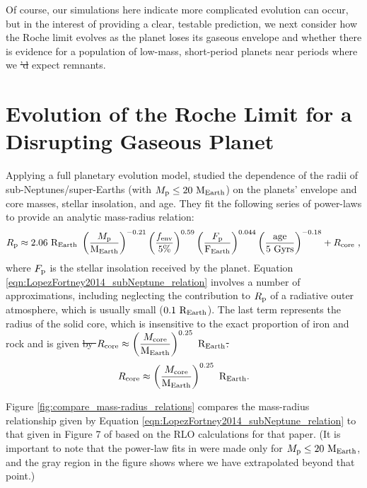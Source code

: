 \documentclass{svjour3}                     %
\providecommand{\DIFadd}[1]{{\protect\color{blue}\uwave{#1}}} %
\providecommand{\DIFdel}[1]{{\protect\color{red}\sout{#1}}}                      %
\providecommand{\DIFaddbegin}{} %
\providecommand{\DIFaddend}{} %
\providecommand{\DIFdelbegin}{} %
\providecommand{\DIFdelend}{} %
\begin{document}
Of course, our simulations here indicate more complicated evolution can occur, but in the interest of providing a clear, testable prediction, we next consider how the Roche limit evolves as the planet loses its gaseous envelope and whether there is evidence for a population of low-mass, short-period planets near periods where we \DIFdelbegin \DIFdel{'d }\DIFdelend \DIFaddbegin \DIFadd{would }\DIFaddend expect remnants.

\section{Evolution of the Roche Limit for a Disrupting Gaseous Planet}
\label{sec:Evolution_of_the_Roche_Limit_for_a_Disrupting_Gaseous_Planet}
Applying a full planetary evolution model, \cite{Lopez2014Understanding} studied the dependence of the radii of sub-Neptunes/super-Earths (with $M_{\rm p} \le 20\ {\rm M_{Earth}}$) on the planets' envelope and core masses, stellar insolation, and age. They fit the following series of power-laws to provide an analytic mass-radius relation:
\begin{equation}
R_{\rm p} \approx 2.06\ {\rm R_{Earth}}\ \left( \dfrac{M_{\rm p}}{\rm M_{Earth}} \right)^{-0.21} \left( \dfrac{f_{\rm env}}{5\%} \right)^{0.59} \left( \dfrac{F_{\rm p}}{\rm F_{Earth}} \right)^{0.044} \left( \dfrac{\rm age}{\rm 5\ Gyrs} \right)^{-0.18} + R_{\rm core}\  ,
\label{eqn:LopezFortney2014_subNeptune_relation}
\end{equation}
where $F_{\rm p}$ is the stellar insolation received by the planet. Equation \ref{eqn:LopezFortney2014_subNeptune_relation} involves a number of approximations, including neglecting the contribution to $R_{\rm p}$ of a radiative outer atmosphere, which is usually small ($0.1\ {\rm R_{Earth}}$). The last term represents the radius of the solid core, which is insensitive to the exact proportion of iron and rock and is given \DIFdelbegin \DIFdel{by $R_{\rm core} \approx \left( \dfrac{M_{\rm core}}{\rm M_{Earth}} \right)^{0.25}\ {\rm R_{Earth}}$. 
}\DIFdelend \DIFaddbegin \DIFadd{in \mbox{%
\cite{Lopez2014Understanding}}%
:
}\begin{equation}
R_{\rm core} \approx \left( \dfrac{M_{\rm core}}{\rm M_{Earth}} \right)^{0.25}\ {\rm R_{Earth}}. 
\label{eqn:LopezFortney2014_rockyplanet_relation}
\end{equation}
\DIFaddend 

Figure \ref{fig:compare_mass-radius_relations} compares the mass-radius relationship given by Equation \ref{eqn:LopezFortney2014_subNeptune_relation} to that given in Figure 7 of \cite{2015ApJ...813..101V} based on the RLO calculations for that paper. (It is important to note that the power-law fits in \cite{Lopez2014Understanding} were made only for $M_{\rm p} \le 20\ {\rm M_{Earth}}$, and the gray region in the figure shows where we have extrapolated beyond that point.) 
\end{document}
